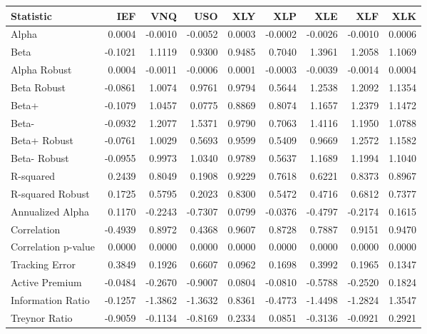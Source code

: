 \begin{tabular}{lrrrrrrrr}
\toprule
Statistic & IEF & VNQ & USO & XLY & XLP & XLE & XLF & XLK \\
\midrule
Alpha & 0.0004 & -0.0010 & -0.0052 & 0.0003 & -0.0002 & -0.0026 & -0.0010 & 0.0006 \\
Beta & -0.1021 & 1.1119 & 0.9300 & 0.9485 & 0.7040 & 1.3961 & 1.2058 & 1.1069 \\
Alpha Robust & 0.0004 & -0.0011 & -0.0006 & 0.0001 & -0.0003 & -0.0039 & -0.0014 & 0.0004 \\
Beta Robust & -0.0861 & 1.0074 & 0.9761 & 0.9794 & 0.5644 & 1.2538 & 1.2092 & 1.1354 \\
Beta+ & -0.1079 & 1.0457 & 0.0775 & 0.8869 & 0.8074 & 1.1657 & 1.2379 & 1.1472 \\
Beta- & -0.0932 & 1.2077 & 1.5371 & 0.9790 & 0.7063 & 1.4116 & 1.1950 & 1.0788 \\
Beta+ Robust & -0.0761 & 1.0029 & 0.5693 & 0.9599 & 0.5409 & 0.9669 & 1.2572 & 1.1582 \\
Beta- Robust & -0.0955 & 0.9973 & 1.0340 & 0.9789 & 0.5637 & 1.1689 & 1.1994 & 1.1040 \\
R-squared & 0.2439 & 0.8049 & 0.1908 & 0.9229 & 0.7618 & 0.6221 & 0.8373 & 0.8967 \\
R-squared Robust & 0.1725 & 0.5795 & 0.2023 & 0.8300 & 0.5472 & 0.4716 & 0.6812 & 0.7377 \\
Annualized Alpha & 0.1170 & -0.2243 & -0.7307 & 0.0799 & -0.0376 & -0.4797 & -0.2174 & 0.1615 \\
Correlation & -0.4939 & 0.8972 & 0.4368 & 0.9607 & 0.8728 & 0.7887 & 0.9151 & 0.9470 \\
Correlation p-value & 0.0000 & 0.0000 & 0.0000 & 0.0000 & 0.0000 & 0.0000 & 0.0000 & 0.0000 \\
Tracking Error & 0.3849 & 0.1926 & 0.6607 & 0.0962 & 0.1698 & 0.3992 & 0.1965 & 0.1347 \\
Active Premium & -0.0484 & -0.2670 & -0.9007 & 0.0804 & -0.0810 & -0.5788 & -0.2520 & 0.1824 \\
Information Ratio & -0.1257 & -1.3862 & -1.3632 & 0.8361 & -0.4773 & -1.4498 & -1.2824 & 1.3547 \\
Treynor Ratio & -0.9059 & -0.1134 & -0.8169 & 0.2334 & 0.0851 & -0.3136 & -0.0921 & 0.2921 \\
\bottomrule
\end{tabular}
